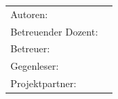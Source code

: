 \begin{titlepage}
\vspace{11ex}
\begin{tabular}{ll} %
	Autoren:         		& \authors	\\
	Betreuender Dozent:		& \advisorprof  	\\
	Betreuer:        		& \advisor    	\\
	Gegenleser:      		& \contraprof  	\\
	Projektpartner:      	& \ins  		\\
\end{tabular}

\end{titlepage}

\restoregeometry %
